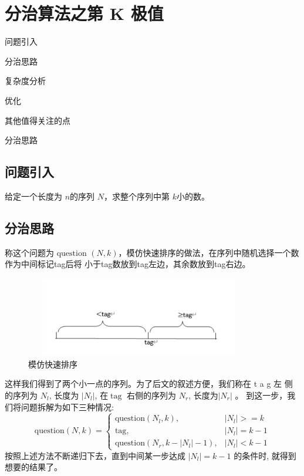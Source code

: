 \chapter{分治算法之第 K 极值}
\begin{introduction}
	\item 问题引入
	\item 分治思路
	\item 复杂度分析
	\item 优化
	\item 其他值得关注的点
	\item 分治思路
	
\end{introduction}
\section{问题引入}
给定一个长度为 $n$的序列 $N$，求整个序列中第 $k$小的数。
\section{分治思路}
称这个问题为$\text { question }(N, k)$，模仿快速排序的做法，在序列中随机选择一个数作为中间标记tag后将
小于tag数放到tag左边，其余数放到tag右边。
\begin{figure}[h]
	\begin{minipage}[t]{1\linewidth}
		\centering
		\includegraphics[width=10cm,height=3.5cm]{image/kth1.png}
		\caption{模仿快速排序}
	\end{minipage}
\end{figure}
这样我们得到了两个小一点的序列。为了后文的叙述方便，我们称在  t a g  左 侧的序列为  $N_{l}$,  长度为  $\left|N_{l}\right|$,  在$ \operatorname{tag}$ 右侧的序列为 $N_{r}$,  长度为$  \left|N_{r}\right|$ 。
到这一步，我们将问题拆解为如下三种情况:
$$
\text {question}(N, k)=\left\{\begin{aligned}
\text {question}\left(N_{l}, k\right) ,&\left|N_{l}\right|>=k \\
\text {tag} ,&\left|N_{l}\right|=k-1 \\
\text {question}\left(N_{r}, k-\left|N_{l}\right|-1\right) ,&\left|N_{l}\right|<k-1
\end{aligned}\right.
$$
按照上述方法不断递归下去，直到中间某一步达成 $ \left|N_{l}\right|=k-1$  的条件时, 就得到想要的结果了。
